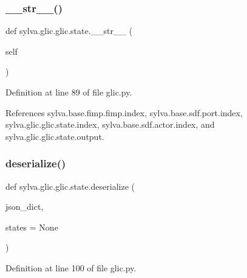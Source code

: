 \subsubsection{\texorpdfstring{\+\_\+\+\_\+str\+\_\+\+\_\+()}{\_\_str\_\_()}}
{\footnotesize\ttfamily def sylva.\+glic.\+glic.\+state.\+\_\+\+\_\+str\+\_\+\+\_\+ (\begin{DoxyParamCaption}\item[{}]{self }\end{DoxyParamCaption})}



Definition at line 89 of file glic.\+py.



References sylva.\+base.\+fimp.\+fimp.\+index, sylva.\+base.\+sdf.\+port.\+index, sylva.\+glic.\+glic.\+state.\+index, sylva.\+base.\+sdf.\+actor.\+index, and sylva.\+glic.\+glic.\+state.\+output.


\mbox{\label{classsylva_1_1glic_1_1glic_1_1state_a00c5deb1533d0282be3a43587d483a2a}} 
\subsubsection{\texorpdfstring{deserialize()}{deserialize()}}
{\footnotesize\ttfamily def sylva.\+glic.\+glic.\+state.\+deserialize (\begin{DoxyParamCaption}\item[{}]{json\+\_\+dict,  }\item[{}]{states = {\ttfamily None} }\end{DoxyParamCaption})\hspace{0.3cm}{\ttfamily [static]}}



Definition at line 100 of file glic.\+py.



